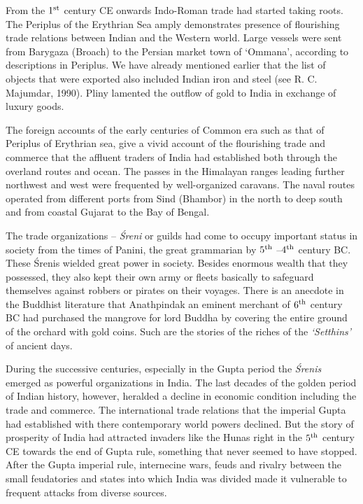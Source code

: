 From the $1^{\rm st}$ century CE onwards Indo-Roman trade had started taking roots. The Periplus of the Erythrian Sea amply demonstrates presence of flourishing trade relations between Indian and the Western world. Large vessels were sent from Barygaza (Broach) to the Persian market town of `Ommana', according to descriptions in Periplus. We have already mentioned earlier that the list of objects that were exported also included Indian iron and steel (see R. C. Majumdar, 1990). Pliny lamented the outflow of gold to India in exchange of luxury goods.

The foreign accounts of the early centuries of Common era such as that of Periplus of Erythrian sea, give a vivid account of the flourishing trade and commerce that the affluent traders of India had established both through the overland routes and ocean. The passes in the Himalayan ranges leading further northwest and west were frequented by well-organized caravans. The naval routes operated from different ports from Sind (Bhambor) in the north to deep south and from coastal Gujarat to the Bay of Bengal.

The trade organizations – {\it Śreni} or guilds had come to occupy important status in society from the times of Panini, the great grammarian by $5^{\rm th}$ –$4^{\rm th}$ century BC. These Śrenis wielded great power in society. Besides enormous wealth that they possessed, they also kept their own army or fleets basically to safeguard themselves against robbers or pirates on their voyages. There is an anecdote in the Buddhist literature that Anathpindak an eminent merchant of $6^{\rm th}$ century BC had purchased the mangrove for lord Buddha by covering the entire ground of the orchard with gold coins. Such are the stories of the riches of the {\it `Setthins'} of ancient days.

During the successive centuries, especially in the Gupta period the {\it Śrenis} emerged as powerful organizations in India. The last decades of the golden period of Indian history, however, heralded a decline in economic condition including the trade and commerce. The international trade relations that the imperial Gupta had established with there contemporary world powers declined. But the story of prosperity of India had attracted invaders like the Hunas right in the $5^{\rm th}$ century CE towards the end of Gupta rule, something that never seemed to have stopped. After the Gupta imperial rule, internecine wars, feuds and rivalry between the small feudatories and states into which India was divided made it vulnerable to frequent attacks from diverse sources. 

